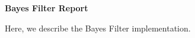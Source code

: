\documentclass[12pt]{article}
\title{
    \vspace{2in}
    \textmd{\textbf{\hmwkClass\ \hmwkTitle}}\\
    \vspace{3in}
}
\author{\hmwkAuthorName}
\date{}
\begin{document}
\maketitle

\pagebreak

\begin{center}
    \large\textbf{Bayes Filter Report}
\end{center}

Here, we describe the Bayes Filter implementation.\\
\vspace{0in}\\

\end{document}
